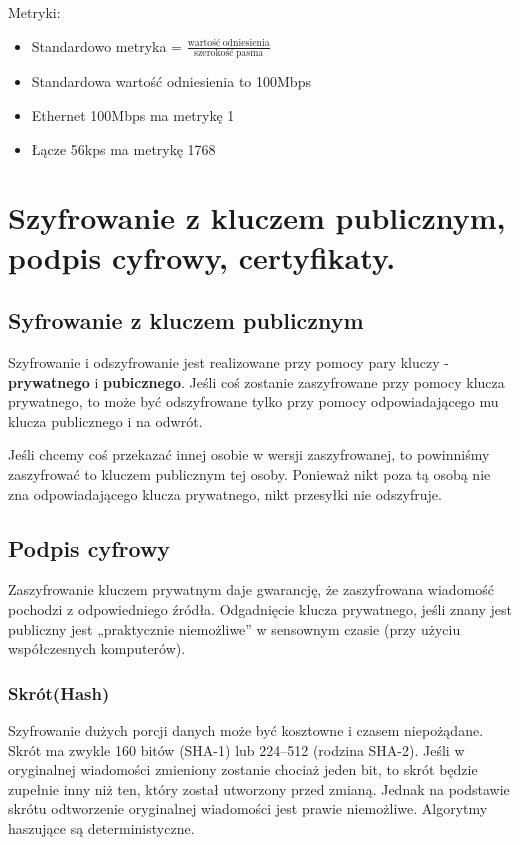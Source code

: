 \documentclass[12pt]{article}
\begin{document}
        Metryki:
        \begin{itemize}
            \item Standardowo metryka = $\frac{\mathrm{wartość\ odniesienia}}{\mathrm{szerokość\ pasma}}$
            \item Standardowa wartość odniesienia to 100Mbps
            \item Ethernet 100Mbps ma metrykę 1
            \item Łącze 56kps ma metrykę 1768
        \end{itemize}

    \newpage

    \section{Szyfrowanie z kluczem publicznym, podpis cyfrowy, certyfikaty.}
    \subsection{Syfrowanie z kluczem publicznym}
    Szyfrowanie i odszyfrowanie jest realizowane przy pomocy pary kluczy - \textbf{prywatnego} i \textbf{pubicznego}.
    Jeśli coś zostanie zaszyfrowane przy pomocy klucza prywatnego, to może być odszyfrowane tylko przy pomocy odpowiadającego mu klucza publicznego i na odwrót.

    Jeśli chcemy coś przekazać innej osobie w wersji zaszyfrowanej, to powinniśmy zaszyfrować to kluczem publicznym tej osoby. Ponieważ nikt poza tą osobą nie
    zna odpowiadającego klucza prywatnego, nikt przesyłki nie odszyfruje.

    \subsection{Podpis cyfrowy}

    Zaszyfrowanie kluczem prywatnym daje gwarancję, że zaszyfrowana wiadomość pochodzi z odpowiedniego źródła.
    Odgadnięcie klucza prywatnego, jeśli znany jest publiczny jest „praktycznie niemożliwe” w sensownym czasie (przy użyciu współczesnych komputerów).


    \subsubsection{Skrót(Hash)}
    Szyfrowanie dużych porcji danych może być kosztowne i czasem niepożądane. Skrót ma zwykle 160 bitów (SHA-1) lub 224--512 (rodzina SHA-2).
    Jeśli w oryginalnej wiadomości zmieniony zostanie chociaż jeden bit, to skrót będzie zupełnie inny niż ten, który został
    utworzony przed zmianą.  Jednak na podstawie skrótu odtworzenie oryginalnej wiadomości jest prawie niemożliwe. Algorytmy haszujące są deterministyczne.
\end{document}
